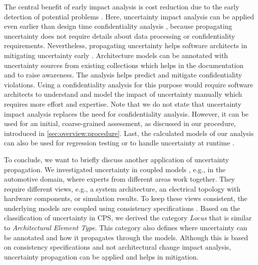 The central benefit of early impact analysis is cost reduction due to the early detection of potential problems \cite{boehm_software_2001}.
Here, uncertainty impact analysis can be applied even earlier than design time confidentiality analysis \cite{seifermann_detecting_2022}, because propagating uncertainty does not require details about data processing or confidentiality requirements.
Nevertheless, propagating uncertainty helps software architects in mitigating uncertainty early \cite{acosta_uncertainty_2022}.
Architecture models can be annotated with uncertainty sources from existing collections \cite{hahner_classification_2023} which helps in the documentation and to raise awareness.
The analysis helps predict and mitigate confidentiality violations.
Using a confidentiality analysis for this purpose would require software architects to understand and model the impact of uncertainty manually which requires more effort and expertise.
Note that we do not state that uncertainty impact analysis replaces the need for confidentiality analysis.
However, it can be used for an initial, coarse-grained assessment, as discussed in our procedure, introduced in \autoref{sec:overview:procedure}.
Last, the calculated models of our analysis can also be used for regression testing or to handle uncertainty at runtime \cite{derakhshanmanesh_model-integrating_2019}.

To conclude, we want to briefly discuss another application of uncertainty propagation.
We investigated uncertainty in coupled models \cite{acosta_uncertainty_2022}, e.g., in the automotive domain, where experts from different areas work together.
They require different views, e.g., a system architecture, an electrical topology with hardware components, or simulation results.
To keep these views consistent, the underlying models are coupled using consistency specifications \cite{klare_enabling_2021}.
Based on the classification of uncertainty in \acf{CPS}, we derived the category \emph{Locus} that is similar to \emph{Architectural Element Type}.
This category also defines where uncertainty can be annotated and how it propagates through the models.
Although this is based on consistency specifications and not architectural change impact analysis, uncertainty propagation can be applied and helps in mitigation.


